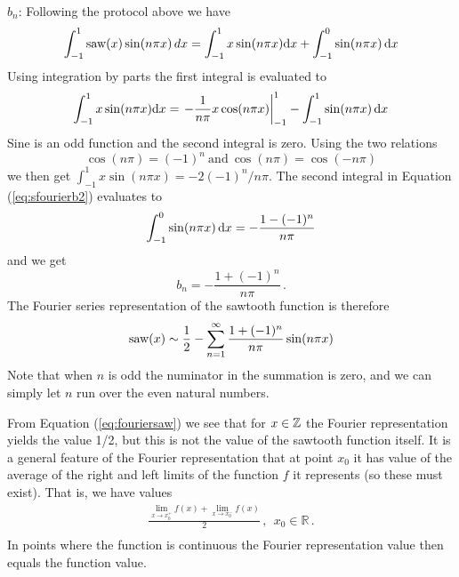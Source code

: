 \begin{example}
	\noindent $b_n$: Following the protocol above we have  
		\begin{eqnarray}
		\int_{-1}^1 \text{saw}(x) \sin(n\pi x) \, dx  
			= \int_{-1}^1 x \sin(n\pi x) \mathrm{d} x + \int_{-1}^0 \sin(n \pi x) \, \mathrm{d} x
			\label{eq:sfourierb2}
		\end{eqnarray}
		Using integration by parts the first integral is evaluated to 
		\begin{eqnarray}
			 \int_{-1}^1 x \sin(n\pi x) \mathrm{d} x = \left .  - \frac{1}{n\pi}
			 x\cos(n\pi x)\right|_{-1}^1 - \int_{-1}^1 \sin(n\pi x) \, \mathrm{d} x
		 \end{eqnarray}
		Sine is an odd function and the second integral is zero. Using the two relations
		\begin{equation}
			\cos(n\pi) = (-1)^n \ \text{and} \ \cos(n\pi) = \cos(-n \pi)
		\end{equation}
		we then get $\int_{-1}^1 x \sin (n\pi x) = -2(-1)^n/n\pi$. The second integral in Equation 
		(\ref{eq:sfourierb2}) evaluates to 
		\begin{equation}
			\int_{-1}^0 \sin(n \pi x) \, \mathrm{d} x = - \frac{1 - (-1)^n}{n\pi}
		\end{equation}
		and we get 
		\begin{equation}
			b_n = -\frac{1 + (-1)^n}{n \pi} \, .
		\end{equation}	 
		The Fourier series representation of the sawtooth function is therefore
		\begin{equation}
			\label{eq:fouriersaw}
			\text{saw}(x) \sim \frac{1}{2} - \sum_{n=1}^\infty  \frac{1 + (-1)^n}{n \pi} \sin(n\pi x) 
		\end{equation}
		Note that when $n$ is odd the numinator in the summation is zero, and we can simply 
		let $n$ run over the even natural numbers.
\end{example}

\noindent From Equation (\ref{eq:fouriersaw}) we see that for $x \in \mathbb{Z}$ the Fourier representation yields 
the value 1/2, but this is not the value of the sawtooth function itself. 
It is a general feature of the Fourier representation that at point $x_0$ it has value of the average of the right and 
left limits of the function $f$ it represents (so these must exist). That is, we have values
\begin{eqnarray}
	\frac{ \lim_{x \rightarrow x_0^+}f(x) + \lim_{x \rightarrow
	x_0^-}f(x) }{2} \, , \ \  x_0 \in \mathbb{R} \, . \nonumber \\
\end{eqnarray}
In points where the function is continuous 
the Fourier representation value then equals the function value. 
	
